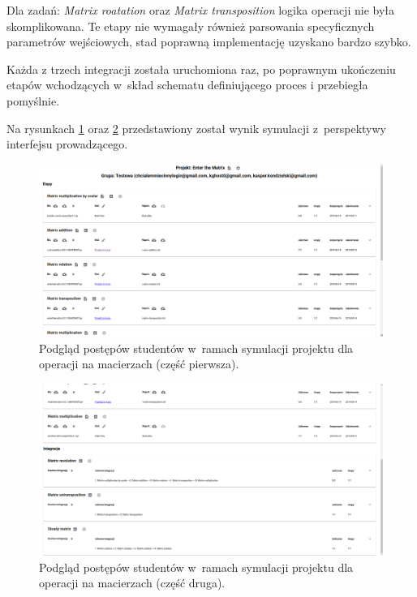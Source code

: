 Dla zadań: \textit{Matrix roatation} oraz \textit{Matrix transposition} logika operacji nie była skomplikowana.
Te etapy nie wymagały również parsowania specyficznych parametrów wejściowych, stad poprawną implementację uzyskano bardzo szybko.

Każda z trzech integracji została uruchomiona raz, po poprawnym ukończeniu etapów wchodzących w~skład schematu definiującego proces i przebiegła pomyślnie.

Na rysunkach \ref{fig:matrix_preview_part_1} oraz \ref{fig:matrix_preview_part_2} przedstawiony został wynik symulacji z~perspektywy interfejsu prowadzącego.

\begin{figure}[H]
    \centering
    \includegraphics[width = 16cm]{chapter07/matrix_preview_part_1.png}
    \caption{Podgląd postępów studentów w~ramach symulacji projektu dla operacji na macierzach (część pierwsza).}
    \label{fig:matrix_preview_part_1}
\end{figure}

\begin{figure}[H]
    \centering
    \includegraphics[width = 16cm]{chapter07/matrix_preview_part_2.png}
    \caption{Podgląd postępów studentów w~ramach symulacji projektu dla operacji na macierzach (część druga).}
    \label{fig:matrix_preview_part_2}
\end{figure}


